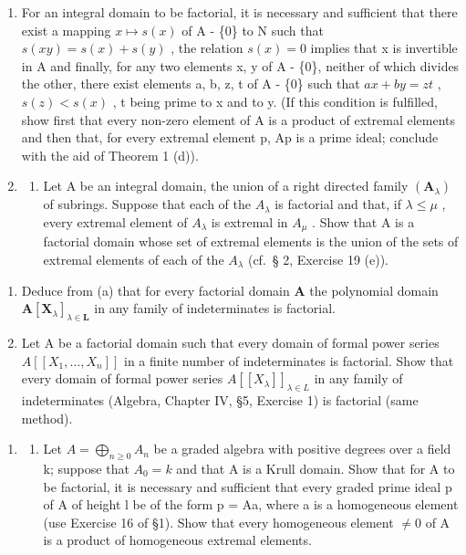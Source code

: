 \begin{enumerate}
\def\labelenumi{\arabic{enumi}.}
\item
  For an integral domain to be factorial, it is necessary and sufficient that there exist a mapping \(x \mapsto s(x)\) of A - \{0\} to N such that \(s(xy) = s(x) + s(y)\) , the relation \(s(x) = 0\) implies that x is invertible in A and finally, for any two elements x, y of A - \{0\}, neither of which divides the other, there exist elements a, b, z, t of A - \{0\} such that \(ax + by = zt\) , \(s(z) < s(x)\) , t being prime to x and to y. (If this condition is fulfilled, show first that every non-zero element of A is a product of extremal elements and then that, for every extremal element p, Ap is a prime ideal; conclude with the aid of Theorem 1 (d)).
\item
  \begin{enumerate}
  \def\labelenumii{(\alph{enumii})}
  \tightlist
  \item
    Let A be an integral domain, the union of a right directed family \((\mathbf{A}_{\lambda})\) of subrings. Suppose that each of the \(A_{\lambda}\) is factorial and that, if \(\lambda \leqslant \mu\) , every extremal element of \(A_{\lambda}\) is extremal in \(A_{\mu}\) . Show that A is a factorial domain whose set of extremal elements is the union of the sets of extremal elements of each of the \(A_{\lambda}\) (cf.~§ 2, Exercise 19 (e)).
  \end{enumerate}
\end{enumerate}

\begin{enumerate}
\def\labelenumi{(\alph{enumi})}
\setcounter{enumi}{1}
\item
  Deduce from (a) that for every factorial domain \(\mathbf{A}\) the polynomial domain \(\mathbf{A}[\mathbf{X}_{\lambda}]_{\lambda \in \mathbf{L}}\) in any family of indeterminates is factorial.
\item
  Let A be a factorial domain such that every domain of formal power series \(A[[X_{1},\ldots,X_{n}]]\) in a finite number of indeterminates is factorial. Show that every domain of formal power series \(A[[X_{\lambda}]]_{\lambda\in L}\) in any family of indeterminates (Algebra, Chapter IV, §5, Exercise 1) is factorial (same method).
\end{enumerate}

\begin{enumerate}
\def\labelenumi{\arabic{enumi}.}
\setcounter{enumi}{2}
\tightlist
\item
  \begin{enumerate}
  \def\labelenumii{(\alph{enumii})}
  \tightlist
  \item
    Let \(A = \bigoplus_{n \geqslant 0} A_n\) be a graded algebra with positive degrees over a field k; suppose that \(A_0 = k\) and that A is a Krull domain. Show that for A to be factorial, it is necessary and sufficient that every graded prime ideal p of A of height l be of the form p = Aa, where a is a homogeneous element (use Exercise 16 of §1). Show that every homogeneous element \(\neq 0\) of A is a product of homogeneous extremal elements.
  \end{enumerate}
\end{enumerate}


